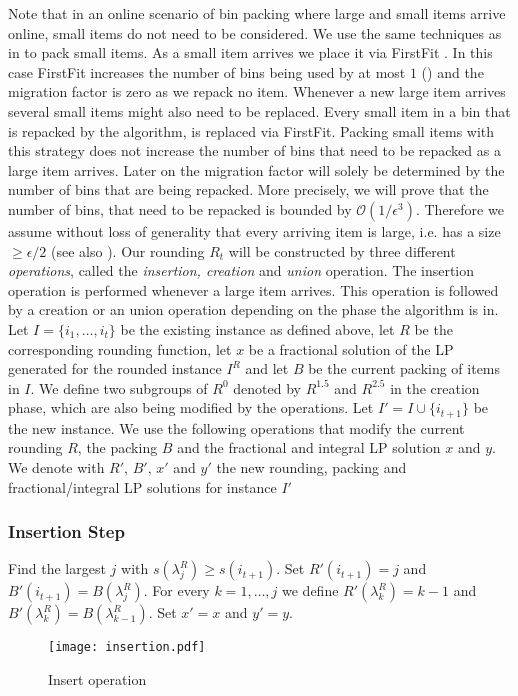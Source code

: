 \documentclass[a4paper,11pt]{article}
\begin{document}
Note that in an online scenario of bin packing  where large and small items arrive online, small items do not
need to be considered. We use the same techniques as in \cite{epstein2006robust} to pack small items. As a small item 
arrives we place it via FirstFit \cite{coffman1984approximation}. 
In this case FirstFit 
increases the number of bins being used by at most $1$ (\cite{de1981bin}) and the migration factor is zero as we 
repack no item.
Whenever a new large item arrives several small items might also need to be replaced. Every small item in a bin
that is repacked by the algorithm, is replaced via FirstFit. Packing small items with this strategy 
does not increase the number of bins that need to
be repacked as a large item arrives. Later on the migration factor will solely be determined by the number of bins
that are being repacked. More precisely, we will prove that the number of bins, that need to be repacked is bounded
by $\mathcal{O}(1/\epsilon^3)$.
Therefore we assume without loss of generality that every arriving item is large, i.e. has a size $\geq \epsilon/2$ 
(see also \cite{epstein2006robust}).
Our rounding $R_{t}$ will be constructed by three different \emph{operations},
called the \emph{insertion, creation} and \emph{union} operation. The
insertion operation is performed whenever a large item arrives. This
operation is followed by a creation or an union operation depending on the phase the algorithm is in. 
Let $I = \{i_1, \ldots ,i_t \}$ be the existing instance as defined above, let $R$ be the corresponding rounding function, let $x$ 
be a fractional solution of the LP generated for the rounded instance $I^R$ and let $B$ be the current packing
of items in $I$. We define two subgroups of $R^0$ denoted by $R^{1.5}$ and $R^{2.5}$ in the creation phase, 
which are also
being modified by the operations.
Let $I' = I \cup \{ i_{t+1} \}$ be the new instance. We use the following operations that modify
the current rounding $R$, the packing $B$ and the fractional and integral LP solution $x$ and $y$.
We denote with $R'$, $B'$, $x'$ and $y'$ the new rounding, packing and fractional/integral LP solutions for instance $I'$
\subsubsection*{Insertion Step}
Find the largest $j$ with $s(\lambda_{j}^R) \geq s(i_{t+1})$. 
Set $R'(i_{t+1})=j$ and $B'(i_{t+1})= B(\lambda_{j}^R)$.
For every $k= 1, \ldots, j$ we define $R'(\lambda_{k}^R) = k-1$ and $B'(\lambda_{k}^R) = B(\lambda_{k-1}^R)$.
Set $x'=x$ and $y'=y$.
\begin{figure}
\texttt{[image: insertion.pdf]}
\caption{Insert operation}
\end{figure}
\end{document}
